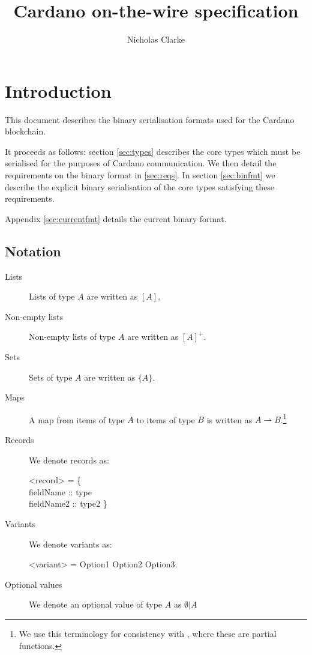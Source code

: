 \documentclass{article}
\title{Cardano on-the-wire specification}
\author{Nicholas Clarke}
\def\fld{\\\llap{,\quad}}%
\newcommand{\rhu}{\rightharpoonup}
\newcommand{\lists}[1]{\left[{#1}\right]}
\newcommand{\nelists}[1]{\left[{#1}\right]^+}
\newcommand{\sets}[1]{\{{#1}\}}
\newcommand{\maybe}[1]{\emptyset | {#1}}
\begin{document}
\maketitle
\tableofcontents

\section{Introduction}

This document describes the binary serialisation formats used for the Cardano
blockchain.

It proceeds as follows: section \ref{sec:types} describes the core types which
must be serialised for the purposes of Cardano communication. We then detail the
requirements on the binary format in \ref{sec:reqs}. In section \ref{sec:binfmt}
we describe the explicit binary serialisation of the core types satisfying these
requirements.

Appendix \ref{sec:currentfmt} details the current binary format.

\subsection{Notation}

\begin{description}
\item[Lists] Lists of type $A$ are written as $\lists{A}$.
\item[Non-empty lists] Non-empty lists of type $A$ are written as $\nelists{A}$.
\item[Sets] Sets of type $A$ are written as $\sets{A}$.
\item[Maps] A map from items of type $A$ to items of type $B$ is written as
  $A\rhu B$.\footnote{We use this terminology for consistency with
    \cite{spiwack}, where these are partial functions.}
\item[Records] We denote records as:
  \begin{grammar}
    <record> = \{
    \fld fieldName :: type
    \fld fieldName2 :: type2
    \}
  \end{grammar}
\item[Variants] We denote variants as:
  \begin{grammar}
    <variant> = Option1 \alt Option2 \alt Option3.
  \end{grammar}
\item[Optional values] We denote an optional value of type $A$ as $\maybe{A}$
\end{description}
\end{document}
